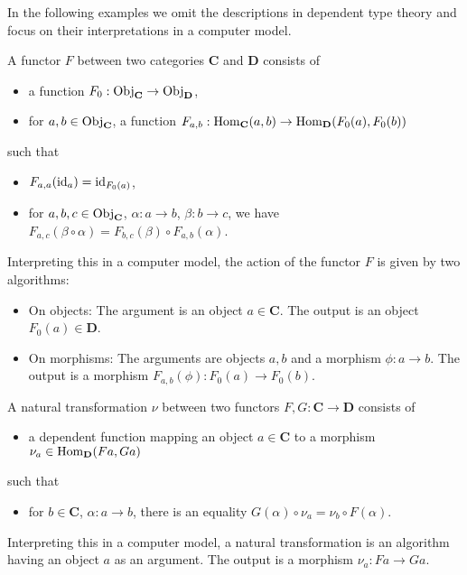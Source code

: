 In the following examples we omit the descriptions in dependent type theory
and focus on their interpretations in a computer model.

\begin{example}[Functors]
 A functor $F$ between two categories $\mathbf{C}$ and $\mathbf{D}$ consists of
 \begin{itemize}
  \item a function $F_{0}: \mathrm{Obj}_{\mathbf{C}} \rightarrow \mathrm{Obj}_{\mathbf{D}}$, 
  \item for $a,b \in \mathrm{Obj}_{\mathbf{C}}$, a function $F_{a,b}: \operatorname{\mathrm{Hom}}_{\mathbf{C}}(a,b) \rightarrow \operatorname{\mathrm{Hom}}_{\mathbf{D}}( F_0(a), F_0(b) )$
 \end{itemize}
 such that
 \begin{itemize}
  \item $F_{a,a}( \mathrm{id}_a ) = \mathrm{id}_{F_{0}(a)}$,
  \item for $a,b,c \in \mathrm{Obj}_{\mathbf{C}}$, $\alpha: a \rightarrow b$, $\beta: b \rightarrow c$, we have
        $F_{a,c}( \beta \circ \alpha ) = F_{b,c}( \beta ) \circ F_{a,b}( \alpha )$.
 \end{itemize}
 Interpreting this in a computer model, the action of the functor $F$ is given by two algorithms:
 \begin{itemize}
  \item On objects: The argument is an object $a \in \mathbf{C}$. The output is an object $F_0(a) \in \mathbf{D}$.
  \item On morphisms: The arguments are objects $a,b$ and a morphism $\phi: a \rightarrow b$. 
        The output is a morphism $F_{a,b}(\phi): F_0(a) \rightarrow F_0(b)$.
 \end{itemize}

\end{example}

\begin{example}
 A natural transformation $\nu$ between two functors $F,G: \mathbf{C} \rightarrow \mathbf{D}$ consists of
 \begin{itemize}
  \item a dependent function mapping an object $a \in \mathbf{C}$ to a morphism $\nu_{a} \in \operatorname{\mathrm{Hom}}_{\mathbf{D}}(Fa, Ga)$
 \end{itemize}
 such that 
 \begin{itemize}
  \item for $b \in \mathbf{C}$, $\alpha: a \rightarrow b$, there is an equality  $G(\alpha) \circ \nu_{a} = \nu_{b} \circ F(\alpha)$.
 \end{itemize}
 Interpreting this in a computer model, a natural transformation is an algorithm 
 having an object $a$ as an argument. The output is a morphism $\nu_a: Fa \rightarrow Ga$.
\end{example}

